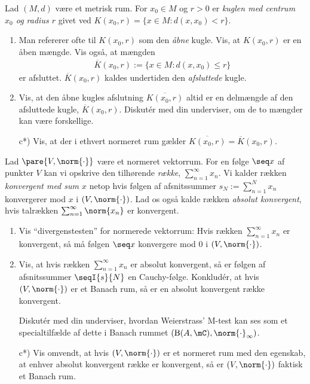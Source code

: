 \begin{opg}
Lad $(M,d)$ være et metrisk rum. For $x_0 \in M$ og $r> 0$ er \emph{kuglen med centrum $x_0$ og radius $r$} givet ved $K(x_0,r)= \{x \in M : d(x,x_0)<r\}$.
\begin{enumerate}
	\item Man refererer ofte til $K(x_0,r)$ som den \emph{åbne} kugle. Vis, at $K(x_0,r)$ er en åben mængde. Vis også, at mængden 
	\begin{align*}
	\overline{K}(x_0, r) := \{x \in M : d(x,x_0) \leq r\}
	\end{align*}
	er afsluttet. $\overline{K}(x_0, r)$ kaldes undertiden den \emph{afsluttede} kugle.
	
	\item Vis, at den åbne kugles afslutning $\overline{K(x_0, r)}$ altid er en delmængde af den afsluttede kugle, $\overline{K}(x_0, r)$. Diskutér med din underviser, om de to mængder kan være forskellige.
	
	\item[c*)] Vis, at der i ethvert normeret rum gælder $\overline{K(x_0,r)}=\overline{K}(x_0, r)$.
	\end{enumerate}
\end{opg}

\begin{opg}
Lad $\pare{V, \norm{\cdot}}$ være et normeret vektorrum. For en følge $\seq x$ af punkter $V$ kan vi opskrive den tilhørende \textit{række}, $\sum_{n=1}^\infty x_n$. Vi kalder rækken \textit{konvergent med sum $x$} netop hvis følgen af afsnitssummer $s_N := \sum_{n=1}^N x_n$ konvergerer mod $x$ i $(V, \norm{\cdot})$. Lad os også kalde rækken \textit{absolut konvergent}, hvis talrækken $\sum_{n=1}^\infty \norm{x_n}$ er konvergent.

\begin{enumerate}
\item Vis ``divergenstesten'' for normerede vektorrum: Hvis rækken $\sum_{n=1}^\infty x_n$ er konvergent, så må følgen $\seq x$ konvergere mod $0$ i $(V, \norm{\cdot})$.

\item Vis, at hvis rækken $\sum_{n=1}^\infty x_n$ er absolut konvergent, så er følgen af afsnitssummer $\seqI{s}{N}$ en Cauchy-følge. Konkludér, at hvis $(V, \norm{\cdot})$ er et Banach rum, så er en absolut konvergent række konvergent.

Diskutér med din underviser, hvordan Weierstrass' M-test kan ses som et specialtilfælde af dette i Banach rummet $(\textup{B}(A, \mC), \norm{\cdot}_\infty)$.

\item[c*)] Vis omvendt, at hvis $(V, \norm{\cdot})$ er et normeret rum med den egenskab, at enhver absolut konvergent række er konvergent, så er $(V, \norm{\cdot})$ faktisk et Banach rum.
\end{enumerate}
\end{opg}

